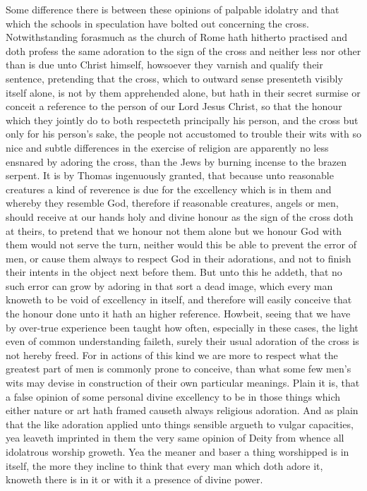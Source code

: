 Some difference there is between these opinions of palpable idolatry and that which the schools in speculation have bolted out concerning the cross. Notwithstanding forasmuch as the church of Rome hath hitherto practised and doth profess the same adoration to the sign of the cross and neither less nor other than is due unto Christ himself, howsoever they varnish and qualify their sentence, pretending that the cross, which to outward sense presenteth visibly itself alone, is not by them apprehended alone, but hath in their secret surmise or conceit a reference to the person of our Lord Jesus Christ, so that the honour which they jointly do to both respecteth principally his person, and the cross but only for his person’s sake, the people not accustomed to trouble their wits with so nice and subtle differences in the exercise of religion are apparently no less ensnared by adoring the cross, than the Jews by burning incense to the brazen serpent.
It is by Thomas ingenuously granted, that because unto reasonable creatures a kind of reverence is due for the excellency which is in them and whereby they resemble God, therefore if reasonable creatures, angels or men, should receive at our hands holy and divine honour as the sign of the cross  doth at theirs,
 to pretend that we honour not them alone but we honour God with them would not serve the turn, neither would this be able to prevent the error of men, or cause them always to respect God in their adorations, and not to finish their intents in the object next before them. But unto this he addeth, that no such error can grow by adoring in that sort a dead image, which every man knoweth to be void of excellency in itself, and therefore will easily conceive that the honour done unto it hath an higher reference.
Howbeit, seeing that we have by over-true experience been taught how often, especially in these cases, the light even of common understanding faileth, surely their usual adoration of the cross is not hereby freed. For in actions of this kind we are more to respect what the greatest part of men is commonly prone to conceive, than what some few men’s wits may devise in construction of their own particular meanings. Plain it is, that a false opinion of some personal divine excellency to be in those things which either nature or art hath framed causeth always religious adoration. And as plain that the like adoration applied unto things sensible argueth to vulgar capacities, yea leaveth imprinted in them the very same opinion of Deity from whence all idolatrous worship groweth. Yea the meaner and baser a thing worshipped is in itself, the more they incline to think that every man which doth adore it, knoweth there is in it or with it a presence of divine power.

